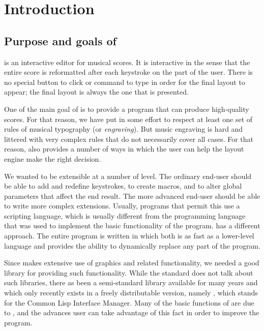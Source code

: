 \chapter{Introduction}
\setcounter{page}{1}

\section{Purpose and goals of {\gs}}

{\gs} is an interactive editor for musical scores.  It is interactive
in the sense that the entire score is reformatted after each keystroke
on the part of the user.  There is no special button to click or
command to type in order for the final layout to appear; the final
layout is always the one that is presented. 

One of the main goal of {\gs} is to provide a program that can produce
high-quality scores.  For that reason, we have put in some effort to
respect at least one set of rules of musical typography (or
\emph{engraving}).  But music engraving is hard and
littered with very complex rules that do not necessarily cover all
cases.  For that reason, {\gs} also provides  a
number of ways in which the user can help the layout engine make the
right decision. 

We wanted {\gs} to be extensible at a number of level.  The ordinary
end-user should be able to add and redefine keystrokes, to create
macros, and to alter global parameters that affect the end result.
The more advanced end-user should be able to write more complex
extensions.  Usually, programs that permit this use a {\gs} scripting
language, which is usually different from the programming language
that was used to implement the basic functionality of the program.
{\gs} has a different approach.  The entire program is written in
{\commonlisp} which both is as fast as a lower-level language and provides the
ability to dynamically replace any part of the program.  

Since {\gs} makes extensive use of graphics and related functionality,
we needed a good library for providing such functionality.  While the
{\commonlisp} standard does not talk about such libraries, there as been a
semi-standard library available for many years and which only recently
exists in a freely distributable version, namely {\clim}\index{\clim},
which stands for the Common Lisp Interface Manager.  Many of the basic
functions of {\gs} are due to {\clim}, and the advances {\gs} user can
take advantage of this fact in order to improve the program. 

